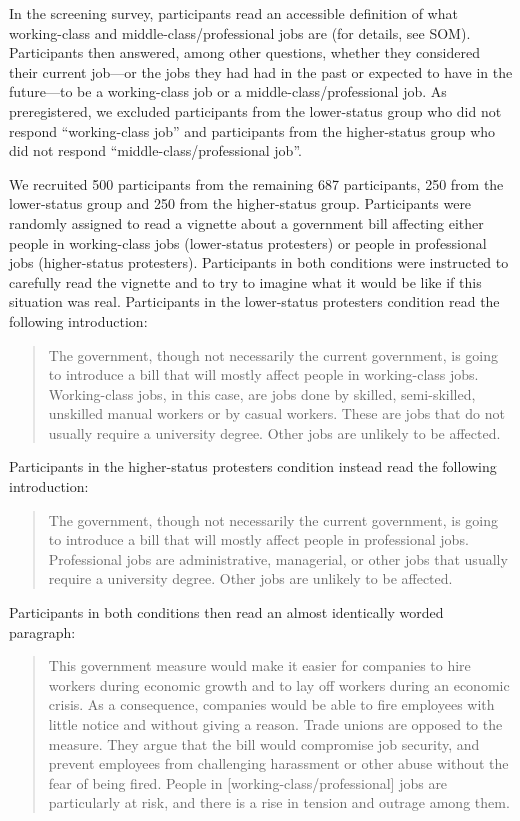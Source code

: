 \documentclass[twocolumn, 11pt, letterpaper]{article}
\begin{document}
In the screening survey, participants read an accessible definition of
what working-class and middle-class/professional jobs are (for details,
see SOM). Participants then answered, among other questions, whether
they considered their current job---or the jobs they had had in the past
or expected to have in the future---to be a working-class job or a
middle-class/professional job. As preregistered, we excluded
participants from the lower-status group who did not respond
``working-class job'' and participants from the higher-status group who
did not respond ``middle-class/professional job''.

We recruited 500 participants from the remaining 687 participants, 250
from the lower-status group and 250 from the higher-status group.
Participants were randomly assigned to read a vignette about a
government bill affecting either people in working-class jobs
(lower-status protesters) or people in professional jobs (higher-status
protesters). Participants in both conditions were instructed to
carefully read the vignette and to try to imagine what it would be like
if this situation was real. Participants in the lower-status protesters
condition read the following introduction:

\begin{quote}
The government, though not necessarily the current government, is going
to introduce a bill that will mostly affect people in working-class
jobs. Working-class jobs, in this case, are jobs done by skilled,
semi-skilled, unskilled manual workers or by casual workers. These are
jobs that do not usually require a university degree. Other jobs are
unlikely to be affected.
\end{quote}

\noindent Participants in the higher-status protesters condition instead
read the following introduction:

\begin{quote}
The government, though not necessarily the current government, is going
to introduce a bill that will mostly affect people in professional jobs.
Professional jobs are administrative, managerial, or other jobs that
usually require a university degree. Other jobs are unlikely to be
affected.
\end{quote}

\noindent Participants in both conditions then read an almost
identically worded paragraph:

\begin{quote}
This government measure would make it easier for companies to hire
workers during economic growth and to lay off workers during an economic
crisis. As a consequence, companies would be able to fire employees with
little notice and without giving a reason. Trade unions are opposed to
the measure. They argue that the bill would compromise job security, and
prevent employees from challenging harassment or other abuse without the
fear of being fired. People in {[}working-class/professional{]} jobs are
particularly at risk, and there is a rise in tension and outrage among
them.
\end{quote}
\end{document}

